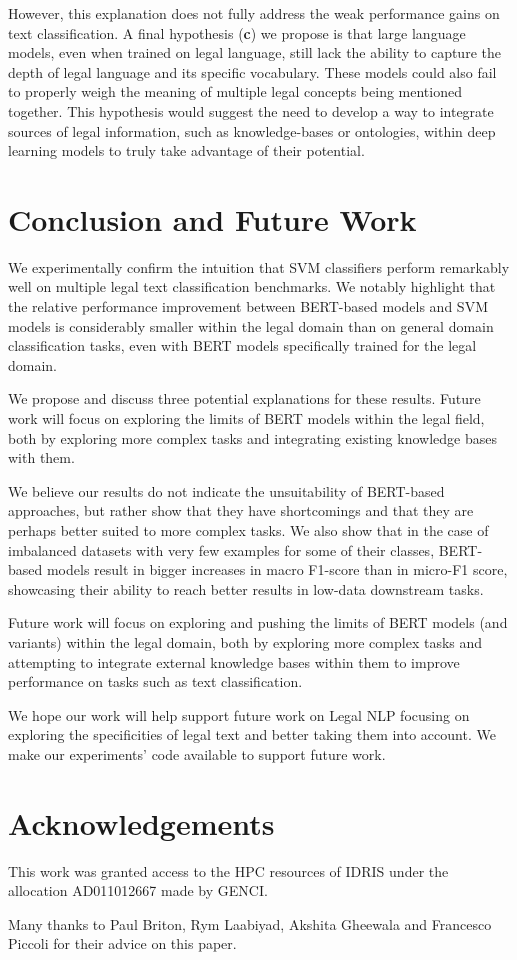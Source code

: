 \documentclass{IOS-Book-Article}
\begin{document}
However, this explanation does not fully address the weak performance gains on text classification. A final hypothesis (\textbf{c}) we propose is that large language models, even when trained on legal language, still lack the ability to capture the depth of legal language and its specific vocabulary. These models could also fail to properly weigh the meaning of multiple legal concepts being mentioned together. This hypothesis would suggest the need to develop a way to integrate sources of legal information, such as  knowledge-bases or ontologies, within deep learning models to truly take advantage of their potential.\\

\section{Conclusion and Future Work}
We experimentally confirm the intuition that SVM classifiers perform remarkably well on multiple legal text classification benchmarks. We notably highlight that the relative performance improvement between BERT-based models and SVM models is considerably smaller within the legal domain than on general domain classification tasks, even with BERT models specifically trained for the legal domain.



We propose and discuss three potential explanations for these results. Future work will focus on exploring the limits of BERT models within the legal field, both by exploring more complex tasks and integrating existing knowledge bases with them.

We believe our results do not indicate the unsuitability of BERT-based approaches, but rather show that they have shortcomings and that they are perhaps better suited to more complex tasks. We also show that in the case of imbalanced datasets with very few examples for some of their classes, BERT-based models result in bigger increases in macro F1-score than in micro-F1 score, showcasing their ability to reach better results in low-data downstream tasks.

Future work will focus on exploring and pushing the limits of BERT models (and variants) within the legal domain, both by exploring more complex tasks and attempting to integrate external knowledge bases within them to improve performance on tasks such as text classification.

We hope our work will help support future work on Legal NLP focusing on exploring the specificities of legal text and better taking them into account. We make our experiments' code available to support future work.



\section{Acknowledgements}
This work was granted access to the HPC resources of IDRIS under the allocation AD011012667 made by GENCI.

Many thanks to Paul Briton, Rym Laabiyad, Akshita Gheewala and Francesco Piccoli for their advice on this paper.



\end{document}
